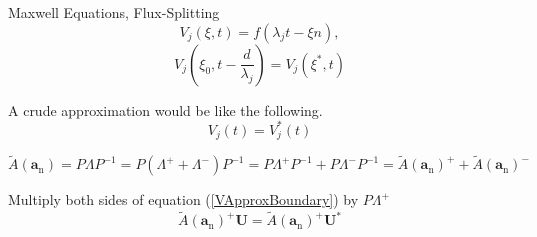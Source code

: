 \begin{frame}{Maxwell Equations, Flux-Splitting}
\begin{equation}
V_{j}(\xi, t)=f\left(\lambda_{j} t-\xi n\right),
\end{equation}
\begin{equation}
V_{j}\left(\xi_{0}, t-\frac{d}{\lambda_{j}}\right)=V_{j}\left(\xi^{*}, t\right)
\end{equation}

A crude approximation would be like the following.
\begin{equation}\label{VApproxBoundary}
V_{j}(t)=V_{j}^{*}(t)
\end{equation}

\begin{equation}
\tilde{A}\left(\boldsymbol{a}_{\mathrm{n}}\right)=P \Lambda P^{-1}=P\left(\Lambda^{+}+\Lambda^{-}\right) P^{-1}=P \Lambda^{+} P^{-1}+P \Lambda^{-} P^{-1}=\tilde{A}\left(\boldsymbol{a}_{\mathrm{n}}\right)^{+}+\tilde{A}\left(\boldsymbol{a}_{\mathrm{n}}\right)^{-}
\end{equation}

Multiply both sides of equation (\ref{VApproxBoundary}) by $P\Lambda^+$
\begin{equation}
\tilde{A}\left(\boldsymbol{a}_{\mathrm{n}}\right)^{+} \boldsymbol{U}=\tilde{A}\left(\boldsymbol{a}_{\mathrm{n}}\right)^{+} \boldsymbol{U}^{*}
\end{equation}
\end{frame}


